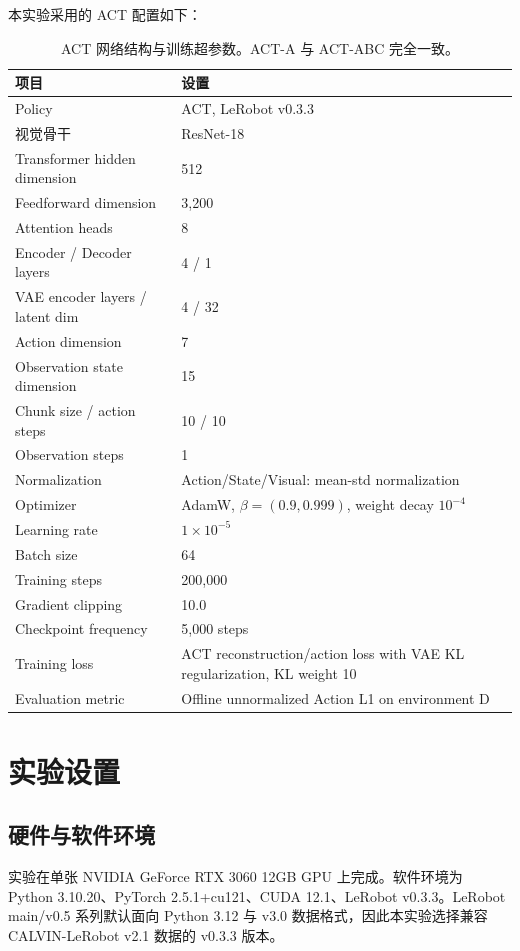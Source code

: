 \documentclass[11pt,a4paper]{ctexart}
\begin{document}
本实验采用的 ACT 配置如下：
\begin{table}[H]
\centering
\caption{ACT 网络结构与训练超参数。ACT-A 与 ACT-ABC 完全一致。}
\begin{tabularx}{\linewidth}{lX}
\toprule
项目 & 设置 \\
\midrule
Policy & ACT, LeRobot v0.3.3 \\
视觉骨干 & ResNet-18 \\
Transformer hidden dimension & 512 \\
Feedforward dimension & 3,200 \\
Attention heads & 8 \\
Encoder / Decoder layers & 4 / 1 \\
VAE encoder layers / latent dim & 4 / 32 \\
Action dimension & 7 \\
Observation state dimension & 15 \\
Chunk size / action steps & 10 / 10 \\
Observation steps & 1 \\
Normalization & Action/State/Visual: mean-std normalization \\
Optimizer & AdamW, $\beta=(0.9,0.999)$, weight decay $10^{-4}$ \\
Learning rate & $1\times10^{-5}$ \\
Batch size & 64 \\
Training steps & 200,000 \\
Gradient clipping & 10.0 \\
Checkpoint frequency & 5,000 steps \\
Training loss & ACT reconstruction/action loss with VAE KL regularization, KL weight 10 \\
Evaluation metric & Offline unnormalized Action L1 on environment D \\
\bottomrule
\end{tabularx}
\end{table}

\section{实验设置}
\subsection{硬件与软件环境}
实验在单张 NVIDIA GeForce RTX 3060 12GB GPU 上完成。软件环境为 Python 3.10.20、PyTorch 2.5.1+cu121、CUDA 12.1、LeRobot v0.3.3。LeRobot main/v0.5 系列默认面向 Python 3.12 与 v3.0 数据格式，因此本实验选择兼容 CALVIN-LeRobot v2.1 数据的 v0.3.3 版本。
\end{document}
